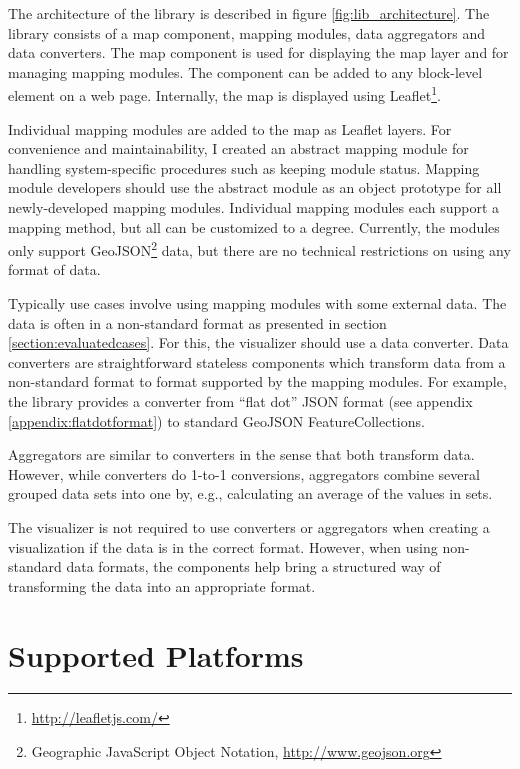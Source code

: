 The architecture of the library is described in figure \ref{fig:lib_architecture}. The library consists of a map component, mapping modules, data aggregators and data converters. The map component is used for displaying the map layer and for managing mapping modules. The component can be added to any block-level element on a web page. Internally, the map is displayed using Leaflet\footnote{\url{http://leafletjs.com/}}. 

Individual mapping modules are added to the map as Leaflet layers. For convenience and maintainability, I created an abstract mapping module for handling system-specific procedures such as keeping module status. Mapping module developers should use the abstract module as an object prototype for all newly-developed mapping modules. Individual mapping modules each support a mapping method, but all can be customized to a degree. Currently, the modules only support GeoJSON\footnote{Geographic JavaScript Object Notation, \url{http://www.geojson.org}} data, but there are no technical restrictions on using any format of data.

Typically use cases involve using mapping modules with some external data. The data is often in a non-standard format as presented in section \ref{section:evaluatedcases}. For this, the visualizer should use a data converter. Data converters are straightforward stateless components which transform data from a non-standard format to format supported by the mapping modules. For example, the library provides a converter from ``flat dot'' JSON format (see appendix \ref{appendix:flatdotformat}) to standard GeoJSON FeatureCollections.

Aggregators are similar to converters in the sense that both transform data. However, while converters do 1-to-1 conversions, aggregators combine several grouped data sets into one by, e.g., calculating an average of the values in sets.
	
The visualizer is not required to use converters or aggregators when creating a visualization if the data is in the correct format. However, when using non-standard data formats, the components help bring a structured way of transforming the data into an appropriate format.

\section{Supported Platforms}

